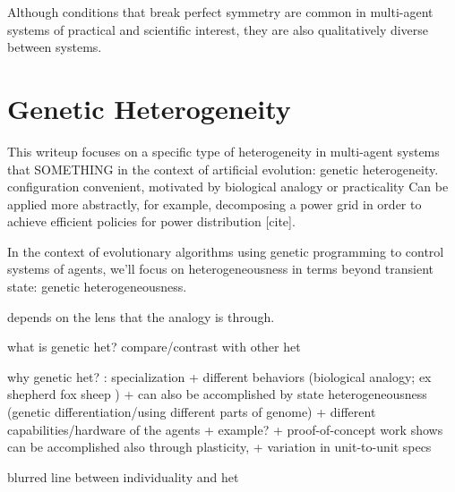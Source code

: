 Although conditions that break perfect symmetry are common in multi-agent systems of practical and scientific interest, they are also qualitatively diverse between systems.

\section{Genetic Heterogeneity}

This writeup focuses on a specific type of heterogeneity in multi-agent systems that SOMETHING in the context of artificial evolution: genetic heterogeneity.
configuration
convenient, motivated by biological analogy or practicality
Can be applied more abstractly, for example, decomposing a power grid in order to achieve efficient policies for power distribution [cite].

In the context of evolutionary algorithms using genetic programming to control systems of agents, we'll focus on heterogeneousness in terms beyond transient state: genetic heterogeneousness.

depends on the lens that the analogy is through.

what is genetic het?
compare/contrast with other het

why genetic het? : specialization
+ different behaviors (biological analogy; ex shepherd fox sheep \cite{potter2001heterogeneity} )
  + can also be accomplished by state heterogeneousness (genetic differentiation/using different parts of genome) \cite{ferrante2015evolution}
+ different capabilities/hardware of the agents \cite{mathews2012supervised}
  + example?
  + proof-of-concept work shows can be accomplished also through plasticity, \cite{tuci2008evolving}
  + variation in unit-to-unit specs \cite{pugh2007parallel} \cite{duarte2016evolution}

blurred line between individuality and het
